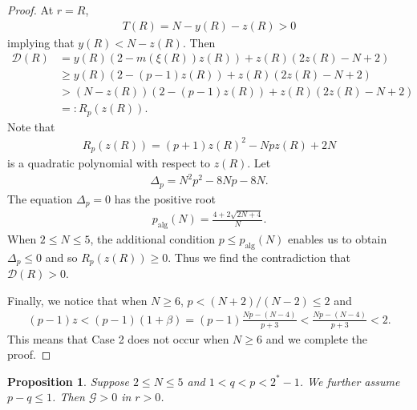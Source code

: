\documentclass{article}
\newtheorem{proposition}[theorem]{Proposition}
\theoremstyle{definition} \theoremstyle{remark}
\numberwithin{equation}{section}
\newcommand{\G}{\mathcal{G}}
\begin{document}
\begin{proof}
		At $r = R$,
		\begin{align*}
			T(R) = N - y(R) - z(R) > 0
		\end{align*}
		implying that $y(R) < N -z(R)$. Then
		\begin{align*}
			\mathcal{D}(R) & = y(R)(2-m(\xi(R))z(R)) + z(R)(2z(R) - N +2) \\
			& \ge y(R)(2-(p-1)z(R)) + z(R)(2z(R) - N +2) \\
			& > (N -z(R))(2-(p-1)z(R)) + z(R)(2z(R) - N +2)\\
			& =: R_p(z(R)).
		\end{align*}
		Note that
		\begin{align*}
			R_p(z(R)) = (p+1)z(R)^2 - Npz(R) + 2N
		\end{align*}
		is a quadratic polynomial with respect to $z(R)$. Let
		\begin{align*}
			\Delta_p = N^2p^2 - 8Np - 8N.
		\end{align*}
		The equation $\Delta_p = 0$ has the positive root
		\begin{align*}
			p_{\text{alg}}(N) = \frac{4 + 2\sqrt{2N + 4}}{N}.
		\end{align*}
		When $2 \le N \le 5$, the additional condition $p \le p_{\text{alg}}(N)$ enables us to obtain $\Delta_p \le 0$ and so $R_p(z(R)) \ge 0$. Thus we find the contradiction that $\mathcal{D}(R) > 0$.

		Finally, we notice that when $N \ge 6$, $p < (N+2)/(N-2) \le 2$ and
		\begin{align*}
			(p-1)z < (p-1)(1+\beta) = (p-1)\frac{Np - (N-4)}{p+3} < \frac{Np - (N-4)}{p+3} < 2.
		\end{align*}
		This means that Case 2 does not occur when $N \ge 6$ and we complete the proof.
	\end{proof}

\vskip0.3in




	\begin{proposition} \label{propG>02}
		Suppose $2 \le N \le 5$ and $1 < q < p < 2^* -1$. We further assume $p - q \le 1$. Then $\G > 0$ in $r > 0$.
	\end{proposition}
\end{document}
